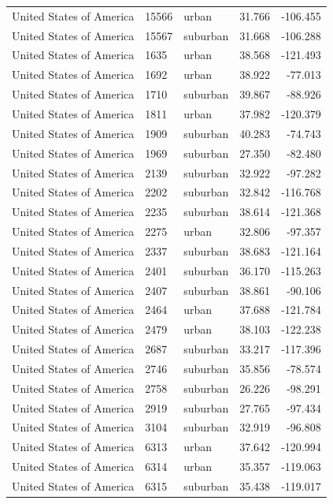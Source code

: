 \documentclass{article}
\begin{document}
\begin{longtable}{lllrr}
United States of America & 15566 & urban & 31.766 & -106.455 \\ 
United States of America & 15567 & suburban & 31.668 & -106.288 \\ 
United States of America & 1635 & urban & 38.568 & -121.493 \\ 
United States of America & 1692 & urban & 38.922 & -77.013 \\ 
United States of America & 1710 & suburban & 39.867 & -88.926 \\ 
United States of America & 1811 & urban & 37.982 & -120.379 \\ 
United States of America & 1909 & suburban & 40.283 & -74.743 \\ 
United States of America & 1969 & suburban & 27.350 & -82.480 \\ 
United States of America & 2139 & suburban & 32.922 & -97.282 \\ 
United States of America & 2202 & suburban & 32.842 & -116.768 \\ 
United States of America & 2235 & suburban & 38.614 & -121.368 \\ 
United States of America & 2275 & urban & 32.806 & -97.357 \\ 
United States of America & 2337 & suburban & 38.683 & -121.164 \\ 
United States of America & 2401 & suburban & 36.170 & -115.263 \\ 
United States of America & 2407 & suburban & 38.861 & -90.106 \\ 
United States of America & 2464 & urban & 37.688 & -121.784 \\ 
United States of America & 2479 & urban & 38.103 & -122.238 \\ 
United States of America & 2687 & suburban & 33.217 & -117.396 \\ 
United States of America & 2746 & suburban & 35.856 & -78.574 \\ 
United States of America & 2758 & suburban & 26.226 & -98.291 \\ 
United States of America & 2919 & suburban & 27.765 & -97.434 \\ 
United States of America & 3104 & suburban & 32.919 & -96.808 \\ 
United States of America & 6313 & urban & 37.642 & -120.994 \\ 
United States of America & 6314 & urban & 35.357 & -119.063 \\ 
United States of America & 6315 & suburban & 35.438 & -119.017 \\ 

\end{longtable}
\end{document}
